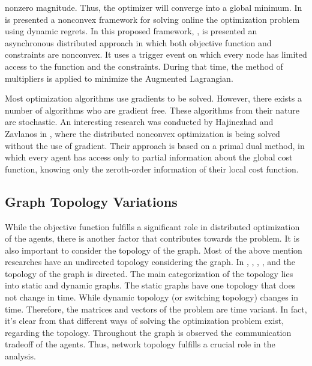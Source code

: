 nonzero magnitude. Thus, the  optimizer will converge into a global minimum. In \cite{10025380,9462469} is presented a nonconvex framework for solving online the optimization problem using dynamic regrets. In this proposed framework, \cite{FARINA2019243}, is presented an asynchronous distributed approach in which both objective function and constraints are nonconvex. It uses a trigger event on which every node has limited access to the function and the constraints. During that time, the method of multipliers is applied to minimize the Augmented Lagrangian. 

    Most optimization algorithms use gradients to be solved. However, there exists a number of algorithms who are gradient free. These algorithms from their nature are stochastic. An interesting research was conducted by Hajinezhad and Zavlanos in \cite{8619333}, where the distributed nonconvex optimization is being solved without the use of gradient. Their approach is based on a primal dual method, in which every agent has access only to partial information about the global cost function, knowing only the zeroth-order information of their local cost function.

\subsection{Graph Topology Variations}
    While the objective function fulfills a significant role in distributed optimization of the agents, there is another factor that contributes towards the problem. It is also important to consider the topology of the graph. Most of the above mention researches have an undirected topology considering the graph. In \cite{GU20197548}, \cite{DOMINGUEZGARCIA201533}, \cite{9112274}, \cite{6894574}, \cite{9992866} and \cite{YOO2018421} the topology of the graph is directed. The main categorization of the topology lies into static and dynamic graphs. The static graphs have one topology that does not change in time. While dynamic topology (or switching topology) changes in time. Therefore, the matrices and vectors of the problem are time variant. In fact, it's clear from \cite{8340193} that different ways of solving the optimization problem exist, regarding the topology. Throughout the graph is observed the communication tradeoff of the agents. Thus, network topology fulfills a crucial role in the analysis. 

